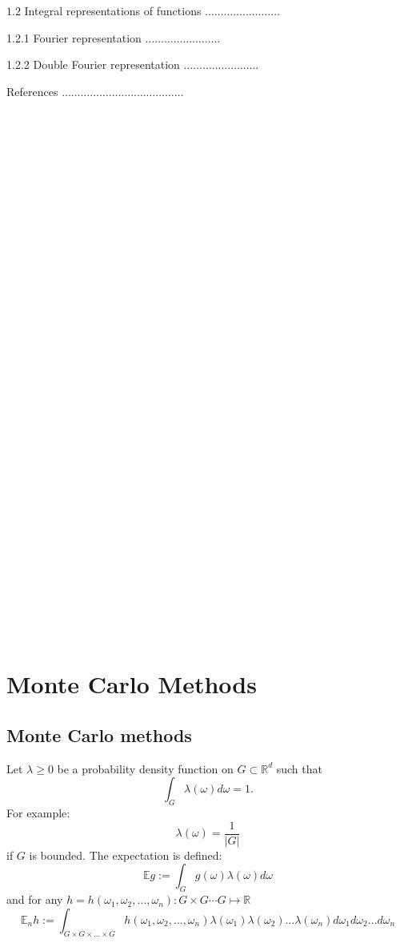 \documentclass[10pt]{article}
\begin{document}
$1.2$ Integral representations of functions $\ldots \ldots \ldots \ldots \ldots \ldots \ldots \ldots$

1.2.1 Fourier representation $\ldots \ldots \ldots \ldots \ldots \ldots \ldots \ldots$

1.2.2 Double Fourier representation $\ldots \ldots \ldots \ldots \ldots \ldots \ldots \ldots$

References $\ldots \ldots \ldots \ldots \ldots \ldots \ldots \ldots \ldots \ldots \ldots \ldots \ldots$

\includegraphics[max width=\textwidth]{2022_01_05_5a7d88a0a7ec0275e0bbg-04}

\section{Monte Carlo Methods}
\subsection{Monte Carlo methods}
Let $\lambda \geq 0$ be a probability density function on $G \subset \mathbb{R}^{d}$ such that
$$
\int_{G} \lambda(\omega) d \omega=1 .
$$
For example:
$$
\lambda(\omega)=\frac{1}{|G|}
$$
if $G$ is bounded. The expectation is defined:
$$
\mathbb{E} g:=\int_{G} g(\omega) \lambda(\omega) d \omega
$$
and for any $h=h\left(\omega_{1}, \omega_{2}, \ldots, \omega_{n}\right): G \times G \cdots G \mapsto \mathbb{R}$
$$
\mathbb{E}_{n} h:=\int_{G \times G \times \ldots \times G} h\left(\omega_{1}, \omega_{2}, \ldots, \omega_{n}\right) \lambda\left(\omega_{1}\right) \lambda\left(\omega_{2}\right) \ldots \lambda\left(\omega_{n}\right) d \omega_{1} d \omega_{2} \ldots d \omega_{n}
$$
\end{document}
